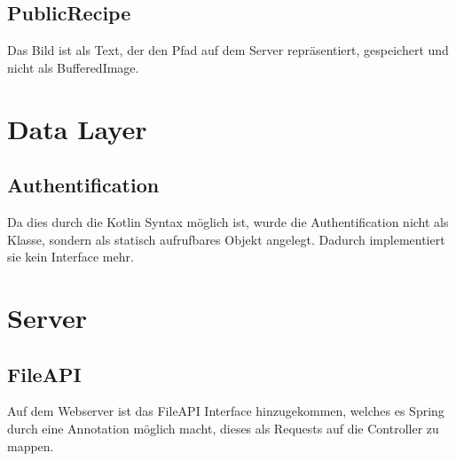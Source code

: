 \subsection{PublicRecipe}
Das Bild ist als Text, der den Pfad auf dem Server repräsentiert, gespeichert und nicht als BufferedImage.


\section{Data Layer}
\subsection{Authentification}
Da dies durch die Kotlin Syntax möglich ist, wurde die Authentification nicht als Klasse, sondern als statisch aufrufbares Objekt angelegt. Dadurch implementiert sie kein Interface mehr.

\section{Server}
\subsection{FileAPI}
Auf dem Webserver ist das FileAPI Interface hinzugekommen, welches es Spring durch eine Annotation möglich macht, dieses als Requests auf die Controller zu mappen.
